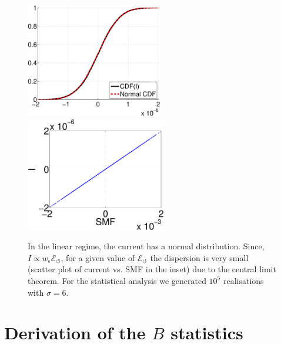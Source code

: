 \documentclass[aps,prl,floats,floatfix,twocolumn]{revtex4}
\begin{document}
\begin{figure}[h!]
\includegraphics[height=5cm]{lin1.eps}
\includegraphics[height=5cm]{lin2.eps}

\caption{
In the linear regime, the current has a normal distribution. Since,
${I \propto w_{\epsilon} \mathcal{E}_{\circlearrowleft}}$, 
for a given value of $ \mathcal{E}_{\circlearrowleft}$ the dispersion is very small (scatter plot of current vs. SMF in the inset)
due to the central limit theorem.
For the statistical analysis we generated $10^5$ realisations with $\sigma=6$. 
}
\label{fa1}
\end{figure}




\clearpage
\section{Derivation of the $B$ statistics}
\end{document}
